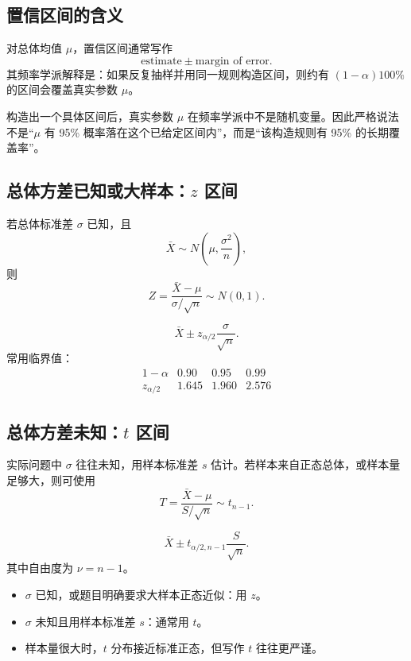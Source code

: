 \documentclass[11pt,a4paper]{article}
\theoremstyle{definition}
\theoremstyle{plain}
\theoremstyle{remark}
\begin{document}
\subsection{置信区间的含义}

对总体均值 $\mu$，置信区间通常写作
\[
    \text{estimate}\pm\text{margin of error}.
\]
其频率学派解释是：如果反复抽样并用同一规则构造区间，则约有 $(1-\alpha)100\%$ 的区间会覆盖真实参数 $\mu$。

\begin{warnbox}[置信区间的常见误解]
构造出一个具体区间后，真实参数 $\mu$ 在频率学派中不是随机变量。因此严格说法不是“$\mu$ 有 95\% 概率落在这个已给定区间内”，而是“该构造规则有 95\% 的长期覆盖率”。
\end{warnbox}

\subsection{\texorpdfstring{总体方差已知或大样本：$z$ 区间}{总体方差已知或大样本：z 区间}}

若总体标准差 $\sigma$ 已知，且
\[
    \bar X \sim N\left(\mu,\frac{\sigma^2}{n}\right),
\]
则
\[
    Z=\frac{\bar X-\mu}{\sigma/\sqrt n}\sim N(0,1).
\]

\begin{memorybox}
\[
    \boxed{
    \bar X\pm z_{\alpha/2}\frac{\sigma}{\sqrt n}.
    }
\]
常用临界值：
\[
\begin{array}{c|ccc}
1-\alpha & 0.90 & 0.95 & 0.99\\
\hline
z_{\alpha/2} & 1.645 & 1.960 & 2.576
\end{array}
\]
\end{memorybox}

\subsection{\texorpdfstring{总体方差未知：$t$ 区间}{总体方差未知：t 区间}}

实际问题中 $\sigma$ 往往未知，用样本标准差 $s$ 估计。若样本来自正态总体，或样本量足够大，则可使用
\[
    T=\frac{\bar X-\mu}{S/\sqrt n}\sim t_{n-1}.
\]

\begin{memorybox}
\[
    \boxed{
    \bar X\pm t_{\alpha/2,n-1}\frac{S}{\sqrt n}.
    }
\]
其中自由度为 $\nu=n-1$。
\end{memorybox}

\begin{methodbox}[选择 $z$ 还是 $t$]
\begin{itemize}
    \item $\sigma$ 已知，或题目明确要求大样本正态近似：用 $z$。
    \item $\sigma$ 未知且用样本标准差 $s$：通常用 $t$。
    \item 样本量很大时，$t$ 分布接近标准正态，但写作 $t$ 往往更严谨。
\end{itemize}
\end{methodbox}
\end{document}
